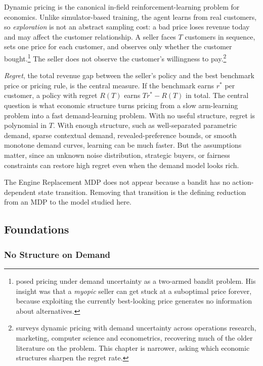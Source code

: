 Dynamic pricing is the canonical in-field reinforcement-learning problem for economics. Unlike simulator-based training, the agent learns from real customers, so \textit{exploration} is not an abstract sampling cost: a bad price loses revenue today and may affect the customer relationship. A seller faces $T$ customers in sequence, sets one price for each customer, and observes only whether the customer bought.\footnote{\citet{Rothschild1974} posed pricing under demand uncertainty as a two-armed bandit problem. His insight was that a \textit{myopic} seller can get stuck at a suboptimal price forever, because exploiting the currently best-looking price generates no information about alternatives.} The seller does not observe the customer's willingness to pay.\footnote{\citet{denBoer2015} surveys dynamic pricing with demand uncertainty across operations research, marketing, computer science and econometrics, recovering much of the older literature on the problem. This chapter is narrower, asking which economic structures sharpen the regret rate.}

\textit{Regret}, the total revenue gap between the seller's policy and the best benchmark price or pricing rule, is the central measure. If the benchmark earns $r^*$ per customer, a policy with regret $R(T)$ earns $T r^* - R(T)$ in total. The central question is what economic structure turns pricing from a slow arm-learning problem into a fast demand-learning problem. With no useful structure, regret is polynomial in $T$. With enough structure, such as well-separated parametric demand, sparse contextual demand, revealed-preference bounds, or smooth monotone demand curves, learning can be much faster. But the assumptions matter, since an unknown noise distribution, strategic buyers, or fairness constraints can restore high regret even when the demand model looks rich.

The Engine Replacement MDP does not appear because a bandit has no action-dependent state transition. Removing that transition is the defining reduction from an MDP to the model studied here.

\subsection{Foundations}
\label{sec:dp_foundations}

\subsubsection{No Structure on Demand}
\label{sec:kleinberg}

